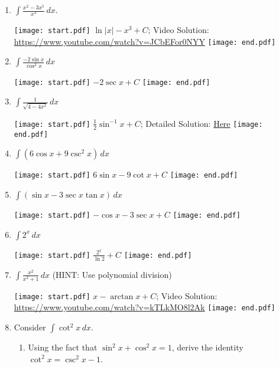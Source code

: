 \documentclass[12pt]{article}
\begin{document}
\begin{enumerate}
\item $\int \frac{x^2-3x^5}{x^3} \,dx$.

\texttt{[image: start.pdf]}
{{$\ln{|x|}-x^3+C$; Video Solution: \textcolor{blue}{\href{https://www.youtube.com/watch?v=JCbEFor0NYY}{https://www.youtube.com/watch?v=JCbEFor0NYY}}}}
\texttt{[image: end.pdf]}


\item $\int \frac{-2\sin{x}}{\cos^{2}x} \,dx$ 

\texttt{[image: start.pdf]}
{{$-2\sec{x}+C$}}
\texttt{[image: end.pdf]}


\item $\int \frac{1}{\sqrt{4-4x^2}} \,dx$ 

\texttt{[image: start.pdf]}
{{$\frac{1}{2}\sin^{-1}{x}+C$; Detailed Solution: \textcolor{blue}{\href{http://www.math.drexel.edu/classes/Calculus/resources/Math122HW/Solutions/122_03_Antiderivatives_14.pdf}{Here}}}}
\texttt{[image: end.pdf]}


\item $\int \left(6\cos{x}+9\csc^{2}{x}\right) \,dx$ 

\texttt{[image: start.pdf]}
{{$6\sin{x}-9\cot{x}+C$}}
\texttt{[image: end.pdf]}


\item $\int \left(\sin{x}-3\sec{x}\tan{x}\right) \,dx$ 

\texttt{[image: start.pdf]}
{{$-\cos{x}-3\sec{x}+C$}}
\texttt{[image: end.pdf]}


\item $\int 2^{x} \,dx$ 

\texttt{[image: start.pdf]}
{{$\frac{2^{x}}{\ln{2}}+C$}}
\texttt{[image: end.pdf]}


\item $\int \frac{x^2}{x^2+1} \,dx$ (HINT: Use polynomial division)

\texttt{[image: start.pdf]}
{{$x-\arctan{x}+C$; Video Solution: \textcolor{blue}{\href{https://www.youtube.com/watch?v=kTLkMO8l2Ak}{https://www.youtube.com/watch?v=kTLkMO8l2Ak}}}}
\texttt{[image: end.pdf]}


\item Consider $\int{\cot^{2}{x}} \,dx$.

\begin{enumerate}

\item Using the fact that $\sin^{2}{x}+\cos^{2}{x}=1$, derive the identity $\cot^2{x}=\csc^{2}{x}-1$.


\end{enumerate}
\end{enumerate}
\end{document}
